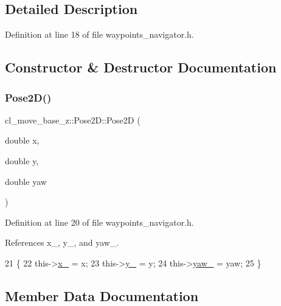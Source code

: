 \subsection{Detailed Description}


Definition at line 18 of file waypoints\+\_\+navigator.\+h.



\subsection{Constructor \& Destructor Documentation}
\mbox{\label{structcl__move__base__z_1_1Pose2D_ac84fa69c2c2dda7ec107a52e9f2c2fcf}} 
\subsubsection{\texorpdfstring{Pose2\+D()}{Pose2D()}}
{\footnotesize\ttfamily cl\+\_\+move\+\_\+base\+\_\+z\+::\+Pose2\+D\+::\+Pose2D (\begin{DoxyParamCaption}\item[{double}]{x,  }\item[{double}]{y,  }\item[{double}]{yaw }\end{DoxyParamCaption})\hspace{0.3cm}{\ttfamily [inline]}}



Definition at line 20 of file waypoints\+\_\+navigator.\+h.



References x\+\_\+, y\+\_\+, and yaw\+\_\+.


\begin{DoxyCode}
21   \{
22     this->\hyperlink{structcl__move__base__z_1_1Pose2D_a5cf116d8264305c3cf062e573f218854}{x\_} = x;
23     this->\hyperlink{structcl__move__base__z_1_1Pose2D_a745b752ce659fca634aaa386230bb931}{y\_} = y;
24     this->\hyperlink{structcl__move__base__z_1_1Pose2D_aed88c69c4fb64fdca72534843de5350e}{yaw\_} = yaw;
25   \}
\end{DoxyCode}


\subsection{Member Data Documentation}
\mbox{\label{structcl__move__base__z_1_1Pose2D_a5cf116d8264305c3cf062e573f218854}} 
